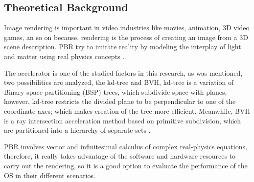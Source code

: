 \documentclass[conference]{IEEEtran}
\begin{document}
\subsection{Theoretical Background}
Image rendering is important in video industries like movies, animation, 3D video games, an so on because, rendering is the process of creating an image from a 3D scene description. PBR try to imitate reality by modeling the interplay of light and matter using real physics concepts \cite{PBR}. \par
The accelerator is one of the studied factors in this research, as was mentioned, two possibilities are analyzed, the kd-tree and BVH, kd-tree is a variation of Binary space partitioning (BSP) trees, which subdivide space with planes, however, kd-tree  restricts the divided plane to be perpendicular to one of the coordinate axes; which makes  creation of the tree more efficient. Meanwhile, BVH is a  ray intersection acceleration method based on primitive subdivision, which are partitioned into a hierarchy of separate sets  \cite{PBR}.\par
PBR involves vector and infinitesimal calculus of complex real-physics equations, therefore, it really takes advantage of the software and hardware resources to carry out the rendering, so it is a good option to evaluate the performance of the OS in their different scenarios.
\end{document}
